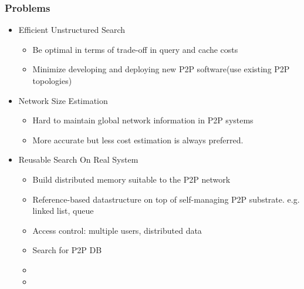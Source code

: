 \documentclass[red]{beamer}
\begin{document}
\begin{frame}
\frametitle{Problems}
\begin{itemize}
\item<1-> Efficient Unstructured Search
\begin{itemize}
\item Be optimal in terms of trade-off in query and cache costs
\item Minimize developing and deploying new P2P software(use existing P2P topologies)
\end{itemize}
\item<2-> Network Size Estimation
\begin{itemize}
\item Hard to maintain global network information in P2P systems
\item More accurate but less cost estimation is always preferred. 
\end{itemize}
\item<3-> Reusable Search On Real System
\begin{itemize}
\item Build distributed memory suitable to the P2P network
\item Reference-based datastructure on top of self-managing P2P substrate. e.g. linked list, queue
\item Access control: multiple users, distributed data
\item<4-> Search for P2P DB
\item
\item
\end{itemize}
\end{itemize}
\end{frame}
\end{document}
